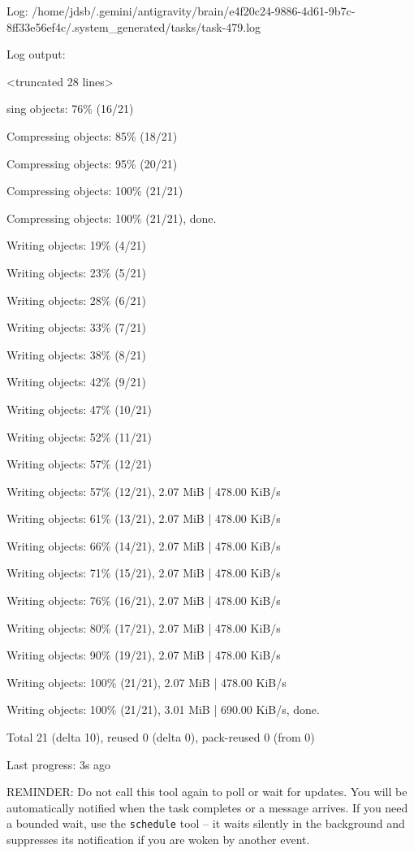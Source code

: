\documentclass[11pt,a4paper]{article}
\begin{document}
Log: /home/jdsb/.gemini/antigravity/brain/e4f20c24-9886-4d61-9b7c-8ff33e56ef4c/.system\_generated/tasks/task-479.log

Log output:

<truncated 28 lines>

sing objects:  76\% (16/21)

Compressing objects:  85\% (18/21)

Compressing objects:  95\% (20/21)

Compressing objects: 100\% (21/21)

Compressing objects: 100\% (21/21), done.

Writing objects:  19\% (4/21)

Writing objects:  23\% (5/21)

Writing objects:  28\% (6/21)

Writing objects:  33\% (7/21)

Writing objects:  38\% (8/21)

Writing objects:  42\% (9/21)

Writing objects:  47\% (10/21)

Writing objects:  52\% (11/21)

Writing objects:  57\% (12/21)

Writing objects:  57\% (12/21), 2.07 MiB | 478.00 KiB/s

Writing objects:  61\% (13/21), 2.07 MiB | 478.00 KiB/s

Writing objects:  66\% (14/21), 2.07 MiB | 478.00 KiB/s

Writing objects:  71\% (15/21), 2.07 MiB | 478.00 KiB/s

Writing objects:  76\% (16/21), 2.07 MiB | 478.00 KiB/s

Writing objects:  80\% (17/21), 2.07 MiB | 478.00 KiB/s

Writing objects:  90\% (19/21), 2.07 MiB | 478.00 KiB/s

Writing objects: 100\% (21/21), 2.07 MiB | 478.00 KiB/s

Writing objects: 100\% (21/21), 3.01 MiB | 690.00 KiB/s, done.

Total 21 (delta 10), reused 0 (delta 0), pack-reused 0 (from 0)


Last progress: 3s ago



REMINDER: Do not call this tool again to poll or wait for updates. You will be automatically notified when the task completes or a message arrives. If you need a bounded wait, use the \texttt{schedule} tool -- it waits silently in the background and suppresses its notification if you are woken by another event.
\end{document}
